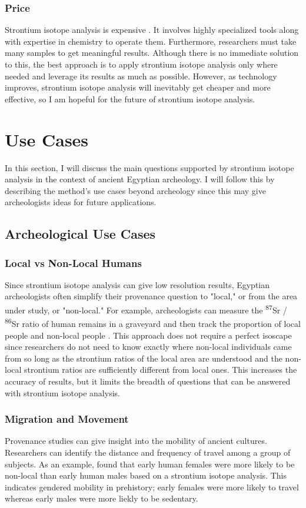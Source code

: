 \documentclass[a4paper, 12pt]{article}
\begin{document}
\subsubsection{Price}
Strontium isotope analysis is expensive \citep{holt2021}. It involves highly specialized tools along
with expertise in chemistry to operate them. Furthermore, researchers must take many samples to get
meaningful results. Although there is no immediate solution to this, the best approach
is to apply strontium isotope analysis only where needed and leverage its results
as much as possible. However, as technology improves, strontium
isotope analysis will inevitably get cheaper and more effective, so I am hopeful
for the future of strontium isotope analysis.


\section{Use Cases}
In this section, I will discuss the main questions supported by strontium isotope
analysis in the context of ancient Egyptian archeology. I will follow this
by describing the method's use cases beyond archeology since this may give
archeologists ideas for future applications.

\subsection{Archeological Use Cases}
\subsubsection{Local vs Non-Local Humans}
Since strontium isotope analysis can give low resolution results, Egyptian archeologists
often simplify their provenance question to "local," or from the area under study,
or "non-local." For example, archeologists can measure the
\textsuperscript{87}Sr / \textsuperscript{86}Sr ratio
of human remains in a graveyard and then track the proportion of local people and
non-local people \citep{holt2021}. This approach does not require
a perfect isoscape since researchers do not need to know exactly where non-local
individuals came from so long as the strontium ratios of the local area are understood and the non-local
strontium ratios are sufficiently different from local ones. This increases the accuracy of results, but it limits the breadth
of questions that can be answered with strontium isotope analysis.


\subsubsection{Migration and Movement}
Provenance studies can give insight into the mobility of ancient cultures. Researchers
can identify the distance and frequency of travel among a group of subjects. As an example, \cite{copeland2011} found that early human females were more likely
to be non-local than early human males based on a strontium isotope analysis.
This indicates gendered mobility in prehistory; early females were more likely to travel whereas early males
were more liekly to be sedentary.
\end{document}
